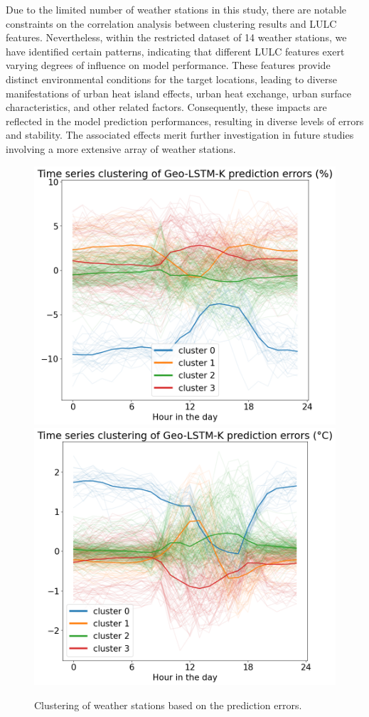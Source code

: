 \documentclass[a4paper,fleqn]{cas-sc}
\begin{document}
Due to the limited number of weather stations in this study, there are notable constraints on the correlation analysis between clustering results and LULC features. Nevertheless, within the restricted dataset of 14 weather stations, we have identified certain patterns, indicating that different LULC features exert varying degrees of influence on model performance. These features provide distinct environmental conditions for the target locations, leading to diverse manifestations of urban heat island effects, urban heat exchange, urban surface characteristics, and other related factors. Consequently, these impacts are reflected in the model prediction performances, resulting in diverse levels of errors and stability. The associated effects merit further investigation in future studies involving a more extensive array of weather stations.


\begin{figure}[!h]
	\centering
	\includegraphics[width=.49\textwidth]{figs/new_figs/RHerrorclustering.png}
	\includegraphics[width=.49\textwidth]{figs/new_figs/TEMerrorclustering.png}
	\caption{Clustering of weather stations based on the prediction errors.}
	\label{FIG:clusterError}
\end{figure}
\end{document}
